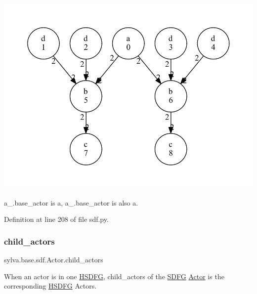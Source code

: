 \begin{DoxyImage}
\includegraphics[width=\textwidth,height=\textheight/2,keepaspectratio=true]{dot_HSDFG_example}
\end{DoxyImage}
 {\ttfamily a\+\_.\+base\+\_\+actor} is {\ttfamily a}, {\ttfamily a\+\_.\+base\+\_\+actor} is also {\ttfamily a}. 

Definition at line 208 of file sdf.\+py.

\mbox{\label{classsylva_1_1base_1_1sdf_1_1_actor_a401878079b1860ed686c9e147f37a84b}} 
\subsubsection{\texorpdfstring{child\+\_\+actors}{child\_actors}}
{\footnotesize\ttfamily sylva.\+base.\+sdf.\+Actor.\+child\+\_\+actors}



When an actor is in one \hyperlink{classsylva_1_1base_1_1sdf_1_1_h_s_d_f_g}{H\+S\+D\+FG}, child\+\_\+actors of the \hyperlink{classsylva_1_1base_1_1sdf_1_1_s_d_f_g}{S\+D\+FG} \hyperlink{classsylva_1_1base_1_1sdf_1_1_actor}{Actor} is the corresponding \hyperlink{classsylva_1_1base_1_1sdf_1_1_h_s_d_f_g}{H\+S\+D\+FG} Actors. 


